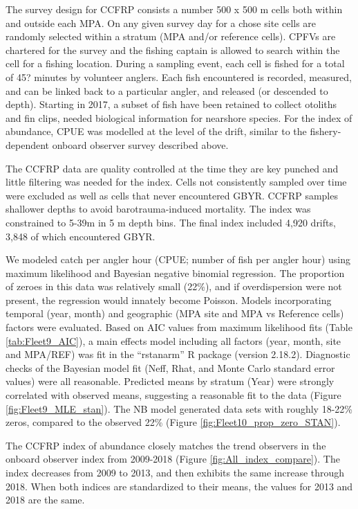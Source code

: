 \documentclass[12pt,]{article}
\begin{document}
The survey design for CCFRP consists a number 500 x 500 m cells both
within and outside each MPA. On any given survey day for a chose site
cells are randomly selected within a stratum (MPA and/or reference
cells). CPFVs are chartered for the survey and the fishing captain is
allowed to search within the cell for a fishing location. During a
sampling event, each cell is fished for a total of 45? minutes by
volunteer anglers. Each fish encountered is recorded, measured, and can
be linked back to a particular angler, and released (or descended to
depth). Starting in 2017, a subset of fish have been retained to collect
otoliths and fin clips, needed biological information for nearshore
species. For the index of abundance, CPUE was modelled at the level of
the drift, similar to the fishery-dependent onboard observer survey
described above.

The CCFRP data are quality controlled at the time they are key punched
and little filtering was needed for the index. Cells not consistently
sampled over time were excluded as well as cells that never encountered
GBYR. CCFRP samples shallower depths to avoid barotrauma-induced
mortality. The index was constrained to 5-39m in 5 m depth bins. The
final index included 4,920 drifts, 3,848 of which encountered GBYR.

We modeled catch per angler hour (CPUE; number of fish per angler hour)
using maximum likelihood and Bayesian negative binomial regression. The
proportion of zeroes in this data was relatively small (22\%), and if
overdispersion were not present, the regression would innately become
Poisson. Models incorporating temporal (year, month) and geographic (MPA
site and MPA vs Reference cells) factors were evaluated. Based on AIC
values from maximum likelihood fits (Table \ref{tab:Fleet9_AIC}), a main
effects model including all factors (year, month, site and MPA/REF) was
fit in the ``rstanarm'' R package (version 2.18.2). Diagnostic checks of
the Bayesian model fit (Neff, Rhat, and Monte Carlo standard error
values) were all reasonable. Predicted means by stratum (Year) were
strongly correlated with observed means, suggesting a reasonable fit to
the data (Figure \ref{fig:Fleet9_MLE_stan}). The NB model generated data
sets with roughly 18-22\% zeros, compared to the observed 22\% (Figure
\ref{fig:Fleet10_prop_zero_STAN}).

The CCFRP index of abundance closely matches the trend observers in the
onboard observer index from 2009-2018 (Figure
\ref{fig:All_index_compare}). The index decreases from 2009 to 2013, and
then exhibits the same increase through 2018. When both indices are
standardized to their means, the values for 2013 and 2018 are the same.
\end{document}

